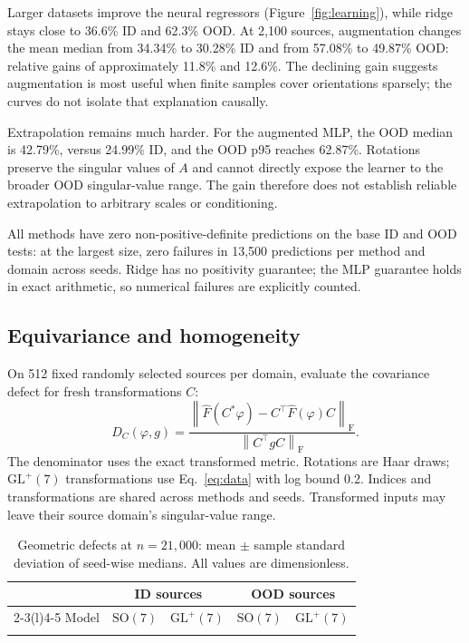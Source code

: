 \documentclass[a4paper,11pt]{article}
\newcommand{\SO}{\mathrm{SO}}
\newcommand{\GLp}{\mathrm{GL}^{+}}
\newcommand{\Fhat}{\widehat F}
\newcommand{\normF}[1]{\left\lVert#1\right\rVert_{\mathrm F}}
\begin{document}
Larger datasets improve the neural regressors (Figure~\ref{fig:learning}), while
ridge stays close to 36.6\% ID and 62.3\% OOD. At 2,100 sources, augmentation
changes the mean median from 34.34\% to 30.28\% ID and from 57.08\% to 49.87\% OOD:
relative gains of approximately 11.8\% and 12.6\%. The declining gain suggests
augmentation is most useful when finite samples cover orientations sparsely;
the curves do not isolate that explanation causally.

Extrapolation remains much harder. For the augmented MLP, the OOD median is
42.79\%, versus 24.99\% ID, and the OOD p95 reaches 62.87\%. Rotations preserve
the singular values of $A$ and cannot directly expose the learner to the broader
OOD singular-value range. The gain therefore does not establish reliable
extrapolation to arbitrary scales or conditioning.

All methods have zero non-positive-definite predictions on the base ID and OOD
tests: at the largest size, zero failures in 13,500 predictions per method and
domain across seeds. Ridge has no positivity guarantee; the MLP guarantee holds
in exact arithmetic, so numerical failures are explicitly counted.

\newpage
\subsection{Equivariance and homogeneity}
On 512 fixed randomly selected sources per domain, evaluate the covariance defect
for fresh transformations $C$:
\begin{equation}\label{eq:defect}
D_C(\varphi,g)=
\frac{\normF{\Fhat(C^*\varphi)-C^\top\Fhat(\varphi)C}}
     {\normF{C^\top gC}}.
\end{equation}
The denominator uses the exact transformed metric. Rotations are Haar draws;
$\GLp(7)$ transformations use Eq.~\eqref{eq:data} with log bound 0.2. Indices and
transformations are shared across methods and seeds. Transformed inputs may leave
their source domain's singular-value range.

\begin{table}[h]
\centering
\caption{Geometric defects at $n=21{,}000$: mean $\pm$ sample standard deviation
of seed-wise medians. All values are dimensionless.}
\label{tab:geometry}
\small\setlength{\tabcolsep}{4pt}
\begin{tabular}{@{}lcccc@{}}
\toprule
&\multicolumn{2}{c}{ID sources}&\multicolumn{2}{c}{OOD sources}\\
\cmidrule(lr){2-3}\cmidrule(l){4-5}
Model&$\SO(7)$&$\GLp(7)$&$\SO(7)$&$\GLp(7)$\\
\midrule
{}
\bottomrule
\end{tabular}
\end{table}
\end{document}
